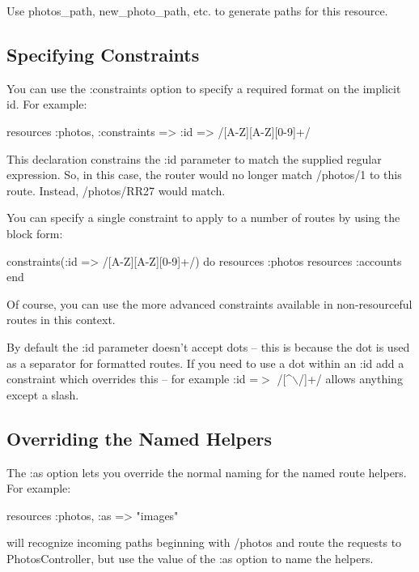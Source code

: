 \documentclass[10pt]{book}
\newenvironment{code}{%
  \scriptsize
    \verbatim
}{%
    \endverbatim
    \newline
}
\begin{document}
Use photos\_path, new\_photo\_path, etc. to generate paths for this resource.

\subsection{ Specifying Constraints}

You can use the :constraints option to specify a required format on the implicit id. For example:
\begin{code}
resources :photos, :constraints => {:id => /[A-Z][A-Z][0-9]+/}
\end{code}

This declaration constrains the :id parameter to match the supplied regular expression. So, in this case, the router would no longer match /photos/1 to this route. Instead, /photos/RR27 would match.

You can specify a single constraint to apply to a number of routes by using the block form:
\begin{code}
constraints(:id => /[A-Z][A-Z][0-9]+/) do
  resources :photos
  resources :accounts
end
\end{code}

Of course, you can use the more advanced constraints available in non-resourceful routes in this context.

By default the :id parameter doesn’t  accept dots – this is because the dot is used as a separator for  formatted routes. If you need to use a dot within an :id add a constraint which overrides this – for example :id =$>$ /[\textasciicircum$\backslash$/]+/ allows anything except a slash.

\subsection{ Overriding the Named Helpers}

The :as option lets you override the normal naming for the named route helpers. For example:
\begin{code}
resources :photos, :as => "images"
\end{code}

will recognize incoming paths beginning with /photos and route the requests to PhotosController, but use the value of the :as option to name the helpers.\\
\end{document}
